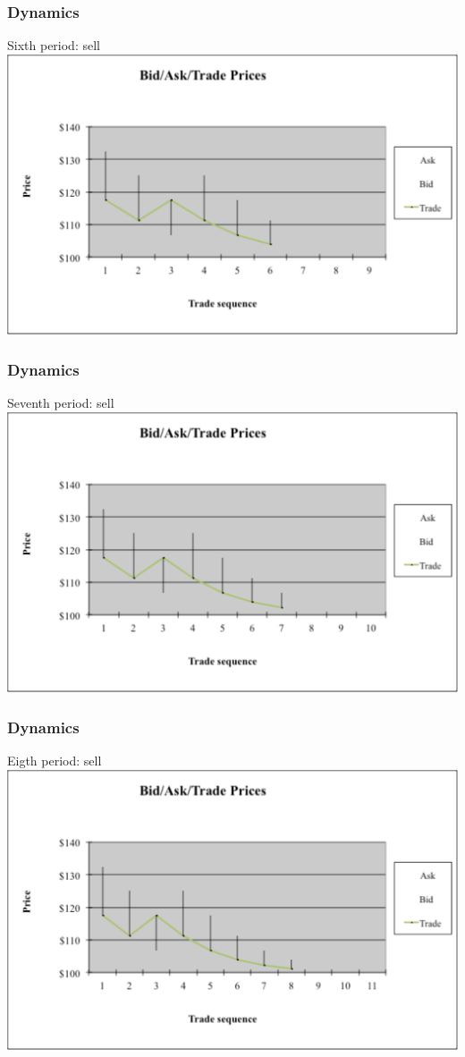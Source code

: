\documentclass[english,10pt]{beamer}
\begin{document}
\begin{frame} [noframenumbering]
	\frametitle{Dynamics}
	Sixth period: sell
	\center
	\includegraphics[width=0.9\linewidth]{pics/P6_Image.pdf}
\end{frame}


\begin{frame} [noframenumbering]
	\frametitle{Dynamics}
	Seventh period: sell
	\center
	\includegraphics[width=0.9\linewidth]{pics/P7_Image.pdf}
\end{frame}


\begin{frame} [noframenumbering]
	\frametitle{Dynamics}
	Eigth period: sell
	\center
	\includegraphics[width=0.9\linewidth]{pics/P8_Image.pdf}
\end{frame}
\end{document}
